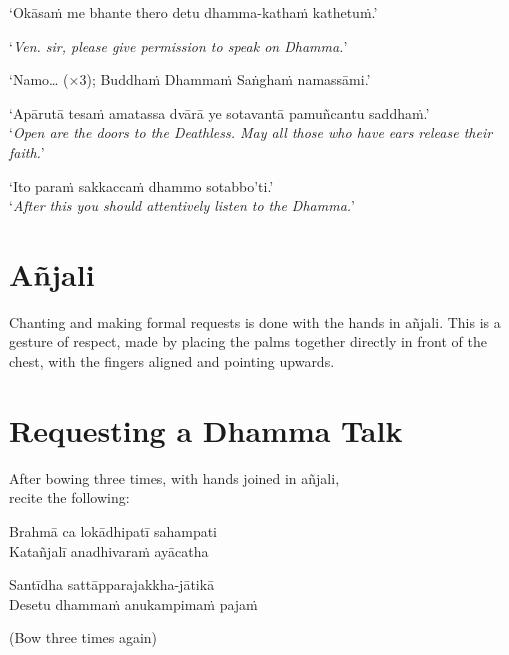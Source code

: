 ‘Okāsaṁ me bhante thero detu dhamma-kathaṁ kathetuṁ.’

‘\emph{Ven. sir, please give permission to speak on Dhamma.}’

‘Namo… (×3); Buddhaṁ Dhammaṁ Saṅghaṁ namassāmi.’


‘Apārutā tesaṁ amatassa dvārā ye sotavantā pamuñcantu saddhaṁ.’\\
‘\emph{Open are the doors to the Deathless. May all those who have ears release their faith.}’

‘Ito paraṁ sakkaccaṁ dhammo sotabbo'ti.’\\
‘\emph{After this you should attentively listen to the Dhamma.}’

\section{Añjali}

Chanting and making formal requests is done with the hands in añjali.
This is a gesture of respect, made by placing the palms together
directly in front of the chest, with the fingers aligned and pointing
upwards.

\section{Requesting a Dhamma Talk}

\ifhandbookedition
\enlargethispage{\baselineskip}
\fi

\vspace*{-0.2\baselineskip}

\begin{instruction}
  After bowing three times, with hands joined in añjali,\\
  recite the following:
\end{instruction}

\vspace*{\parskip}

\begin{paritta}
Brahmā ca lokādhipatī sahampati\\
Katañjalī anadhivaraṁ ayācatha

Santīdha sattāpparajakkha-jātikā\\
Desetu dhammaṁ anukampimaṁ pajaṁ
\end{paritta}

\begin{instruction}
  (Bow three times again)
\end{instruction}

